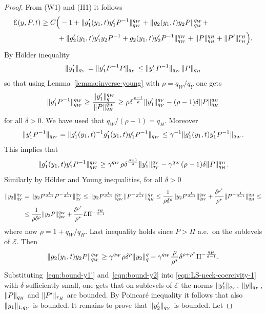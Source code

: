 \documentclass[a4paper,10pt,oneside]{amsbook}
\numberwithin{section}{chapter}
\numberwithin{equation}{chapter}
\theoremstyle{definition}
\DeclarePairedDelimiter{\norm}{\lVert}{\rVert}
\begin{document}
\begin{proof}
From (W1) and (H1) it follows
\begin{equation}
\label{eqn:LS-neck-coercivity-1}
\mathcal{E}(y,P,t)\ge
\begin{multlined}[t]
C\Big(-1+\norm{g_1'(y_1,t)y_1'P^{-1}}_{q_W}^{q_W}+\norm{g_2(y_1,t)y_2P}_{q_W}^{q_W}+\\
+\norm{g_2'(y_1,t)y_1'y_2P^{-1}+g_2(y_1,t)y_2'P^{-1}}_{q_W}^{q_W}+\norm{P}_{q_H}^{q_H}+\norm{P'}_{r_H}^{r_H}\Big).
\end{multlined}
\end{equation}
By H\"older inequality
\[
\norm{y_1'}_{q_Y}=\norm{y_1'P^{-1}P}_{q_Y}\le\norm{y_1'P^{-1}}_{q_W}\norm{P}_{q_H}
\]
so that using Lemma~\ref{lemma:inverse-young} with $\rho=q_W/q_Y$ one gets
\[
\norm{y_1'P^{-1}}_{q_W}^{q_W}\ge\frac{\norm{y_1'}_q^{q_W}}{\norm{P}_{q_H}^{q_W}}\ge\rho\delta^\frac{\rho-1}{\rho}\norm{y_1'}_{q_Y}^{q_Y}-(\rho-1)\delta\norm{P}_{q_H}^{q_H}
\]
for all $\delta>0$. We have used that $q_W/(\rho-1)=q_H$. Moreover
\[
\norm{y_1'P^{-1}}_{q_W}=\norm{g_1'(y_1,t)^{-1}g_1'(y_1,t)y_1'P^{-1}}_{q_W}\le\gamma^{-1}\norm{g_1'(y_1,t)y_1'P^{-1}}_{q_W}.
\]
This implies that
\begin{equation}
\label{eqn:bound-y1'}
\norm{g_1'(y_1,t)y_1'P^{-1}}_{q_W}^{q_W}\ge\gamma^{q_W}\rho\delta^\frac{\rho-1}{\rho}\norm{y_1'}_{q_Y}^{q_Y}-\gamma^{q_W}(\rho-1)\delta\norm{P}_{q_H}^{q_H}.
\end{equation}
Similarly by H\"older and Young inequalities, for all $\delta>0$
\[
\begin{split}
\norm{y_2}_{q_Y}^{q_Y}&=\norm{y_2P^\frac{1}{d-1}P^{-\frac{1}{d-1}}}_{q_Y}^{q_Y}\le\norm{y_2P^\frac{1}{d-1}}_{q_W}^{q_Y}\norm{P^{-\frac{1}{d-1}}}_{q_H}^{q_Y}\le\frac{1}{\rho\delta^\rho}\norm{y_2P^\frac{1}{d-1}}_{q_W}^{q_W}+\frac{\delta^{\rho^*}}{\rho^*}\norm{P^{-\frac{1}{d-1}}}_{q_H}^{q_H}\le\\
&\le\frac{1}{\rho\delta^\rho}\norm{y_2P}_{q_W}^{q_W}+\frac{\delta^{\rho^*}}{\rho^*}L\Pi^{-\frac{q_H}{d-1}}
\end{split}
\]
where now $\rho=1+q_W/q_H$. Last inequality holds since $P>\Pi$ a.e.\ on the sublevels of $\mathcal{E}$. Then
\begin{equation}
\label{eqn:bound-y2}
\norm{g_2(y_1,t)y_2P}_{q_W}^{q_W}\ge\gamma^{q_W}\rho\delta^\rho\norm{y_2}_q^q-\gamma^{q_W}\frac{\rho}{\rho^*}\delta^{\rho+\rho^*}\Pi^{-\frac{q_H}{d-1}}.
\end{equation}
Substituting~\eqref{eqn:bound-y1'} and~\eqref{eqn:bound-y2} into \eqref{eqn:LS-neck-coercivity-1} with $\delta$ sufficiently small, one gets that on sublevels of $\mathcal{E}$ the norms $\norm{y_1'}_{q_Y}$, $\norm{y}_{q_Y}$, $\norm{P}_{q_H}$ and $\norm{P'}_{r_H}$ are bounded. By Poincaré inequality it follows that also $\norm{y_1}_{1,{q_Y}}$ is bounded. It remains to prove that $\norm{y_2'}_{q_Y}$ is bounded. Let

\end{proof}
\end{document}
